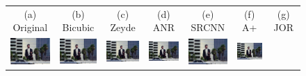 \documentclass[10pt,twocolumn,letterpaper]{article}
\begin{document}

\begin{figure} [tb]
\begin{tabular*}{0.5\textwidth}{ccccccc}
      (a) Original & (b) Bicubic & (c) Zeyde & (d) ANR & (e) SRCNN & (f) A+ & (g) JOR \\  
  \hspace{-2mm}
  \includegraphics[width=2cm]{fig/119082_g.jpg} & \hspace{-4mm}
  \includegraphics[width=2cm]{fig/119082[2-Bicubic]_g.jpg} & \hspace{-4mm}
  \includegraphics[width=2cm]{fig/119082[3-Zeyde]_g.jpg} & \hspace{-4mm}
  \includegraphics[width=2cm]{fig/119082[4-ANR]_g.jpg} & \hspace{-4mm}
  \includegraphics[width=2cm]{fig/119082[5-SRCNN]_g.jpg} & \hspace{-4mm}
  \includegraphics[width=2cm]{fig/119082[6-A+]_g.jpg} & \hspace{-4mm}

\end{tabular*}
\end{figure}
\end{document}
